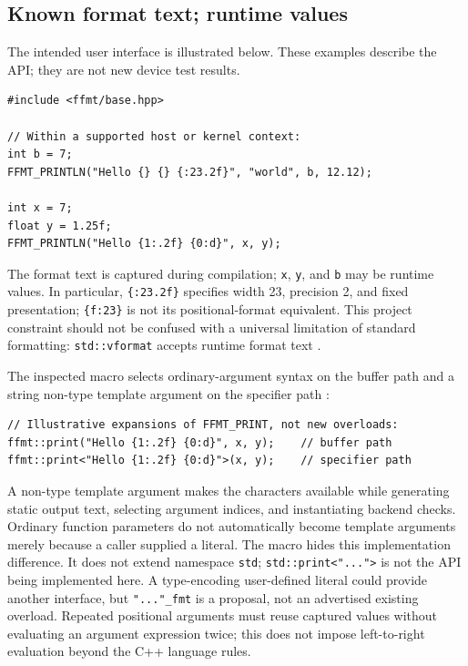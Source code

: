 \documentclass[11pt,letterpaper]{article}
\begin{document}
\subsection{Known format text; runtime values}

The intended user interface is illustrated below. These examples describe the
API; they are not new device test results.

\begin{lstlisting}
#include <ffmt/base.hpp>

// Within a supported host or kernel context:
int b = 7;
FFMT_PRINTLN("Hello {} {} {:23.2f}", "world", b, 12.12);

int x = 7;
float y = 1.25f;
FFMT_PRINTLN("Hello {1:.2f} {0:d}", x, y);
\end{lstlisting}

The format text is captured during compilation; \texttt{x}, \texttt{y}, and
\texttt{b} may be runtime values. In particular, \texttt{\{:23.2f\}} specifies
width 23, precision 2, and fixed presentation; \texttt{\{f:23\}} is not its
positional-format equivalent. This project constraint should not be confused
with a universal limitation of standard formatting: \texttt{std::vformat}
accepts runtime format text \cite{format-functions}.

The inspected macro selects ordinary-argument syntax on the buffer path and
a string non-type template argument on the specifier path \cite{ffmt-source}:

\begin{lstlisting}
// Illustrative expansions of FFMT_PRINT, not new overloads:
ffmt::print("Hello {1:.2f} {0:d}", x, y);    // buffer path
ffmt::print<"Hello {1:.2f} {0:d}">(x, y);    // specifier path
\end{lstlisting}

A non-type template argument makes the characters available while generating
static output text, selecting argument indices, and instantiating backend
checks. Ordinary function parameters do not automatically become template
arguments merely because a caller supplied a literal. The macro hides this
implementation difference. It does not extend namespace \texttt{std};
\texttt{std::print<"...">} is not the API being implemented here.
A type-encoding user-defined literal could provide another interface, but
\texttt{"..."\_fmt} is a proposal, not an advertised existing overload.
Repeated positional arguments must reuse captured values without evaluating
an argument expression twice; this does not impose left-to-right evaluation
beyond the C++ language rules.
\end{document}
